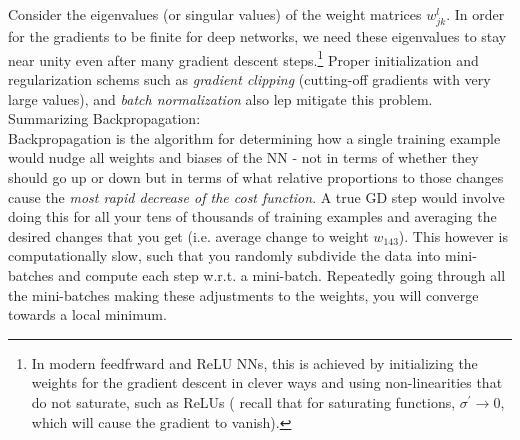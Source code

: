 Consider the eigenvalues (or singular values) of the weight matrices $w^l_{jk}$. In order for the gradients to be finite for deep networks, we need these eigenvalues to stay near unity even after many gradient descent steps.\footnote{ In modern feedfrward and ReLU NNs, this is achieved by initializing the weights for the gradient descent in clever ways and using non-linearities that do not saturate, such as ReLUs ( recall that for saturating functions, $\sigma^\prime \rightarrow 0$, which will cause the gradient to vanish).}
Proper initialization and regularization schems such as \emph{gradient clipping} (cutting-off gradients with very large values), and \emph{batch normalization} also lep mitigate this problem.\\
Summarizing Backpropagation:\\
Backpropagation is the algorithm for determining how a single training example would nudge all weights and biases of the NN - not in terms of whether they should go up or down but in terms of what relative proportions to those changes cause the \emph{most rapid decrease of the cost function}. A true GD step would involve doing this for all your tens of thousands of training examples and averaging the desired changes that you get (i.e. average change to weight $w_{143}$). This however is computationally slow, such that you randomly subdivide the data into mini-batches and compute each step w.r.t. a mini-batch. Repeatedly going through all the mini-batches making these adjustments to the weights, you will converge towards a local minimum.
